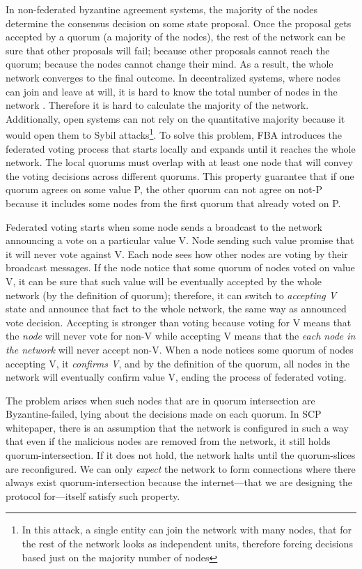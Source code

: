 In non-federated byzantine agreement systems, the majority of the nodes determine the consensus decision on some state proposal. Once the proposal gets accepted by a quorum (a majority of the nodes), the rest of the network can be sure that other proposals will fail; because other proposals cannot reach the quorum; because the nodes cannot change their mind. As a result, the whole network converges to the final outcome.
In decentralized systems, where nodes can join and leave at will, it is hard to know the total number of nodes in the network . Therefore it is hard to calculate the majority of the network. Additionally, open systems can not rely on the quantitative majority because it would open them to Sybil attacks\footnote{In this attack, a single entity can join the network with many nodes, that for the rest of the network looks as independent units, therefore forcing decisions based just on the majority number of nodes}. To solve this problem, FBA introduces the federated voting process that starts locally and expands until it reaches the whole network. The local quorums must overlap with at least one node that will convey the voting decisions across different quorums. This property guarantee that if one quorum agrees on some value P, the other quorum can not agree on not-P because it includes some nodes from the first quorum that already voted on P.

Federated voting starts when some node sends a broadcast to the network announcing a vote on a particular value V. Node sending such value promise that it will never vote against V. Each node sees how other nodes are voting by their broadcast messages. If the node notice that some quorum of nodes voted on value V, it can be sure that such value will be eventually accepted by the whole network (by the definition of quorum); therefore, it can switch to \textit{accepting V} state and announce that fact to the whole network, the same way as announced vote decision. Accepting is stronger than voting because voting for V means that the \textit{node} will never vote for non-V while accepting V means that the \textit{each node in the network} will never accept non-V. When a node notices some quorum of nodes accepting V, it \textit{confirms V}, and by the definition of the quorum, all nodes in the network will eventually confirm value V, ending the process of federated voting.

The problem arises when such nodes that are in quorum intersection are Byzantine-failed, lying about the decisions made on each quorum. In SCP whitepaper, there is an assumption that the network is configured in such a way that even if the malicious nodes are removed from the network, it still holds quorum-intersection. If it does not hold, the network halts until the quorum-slices are reconfigured.
We can only \textit{expect} the network to form connections where there always exist quorum-intersection because the internet––that we are designing the protocol for––itself satisfy such property.

